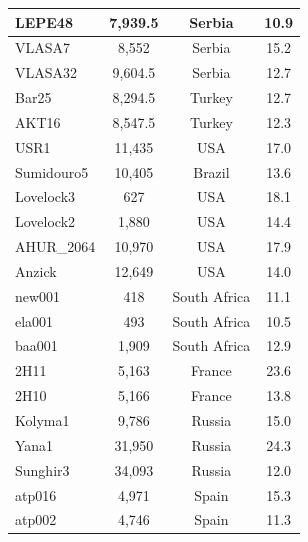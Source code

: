 \begin{longtable}{|l|c|c|c|}
LEPE48 & 7,939.5 & Serbia & 10.9 \\ \hline
VLASA7 & 8,552 & Serbia & 15.2 \\ \hline
VLASA32 & 9,604.5 & Serbia & 12.7 \\ \hline
Bar25 & 8,294.5 & Turkey & 12.7 \\ \hline
AKT16 & 8,547.5 & Turkey & 12.3 \\ \hline
USR1 & 11,435 & USA & 17.0 \\ \hline
Sumidouro5 & 10,405 & Brazil & 13.6 \\ \hline
Lovelock3 & 627 & USA & 18.1 \\ \hline
Lovelock2 & 1,880 & USA & 14.4 \\ \hline
AHUR\_2064 & 10,970 & USA & 17.9 \\ \hline
Anzick & 12,649 & USA & 14.0 \\ \hline
new001 & 418 & South Africa & 11.1 \\ \hline
ela001 & 493 & South Africa & 10.5 \\ \hline
baa001 & 1,909 & South Africa & 12.9 \\ \hline
2H11 & 5,163 & France & 23.6 \\ \hline
2H10 & 5,166 & France & 13.8 \\ \hline
Kolyma1 & 9,786 & Russia & 15.0 \\ \hline
Yana1 & 31,950 & Russia & 24.3 \\ \hline
Sunghir3 & 34,093 & Russia & 12.0 \\ \hline
atp016 & 4,971 & Spain & 15.3 \\ \hline
atp002 & 4,746 & Spain & 11.3
\label{tab:gb_ancient_samples}
\end{longtable}



